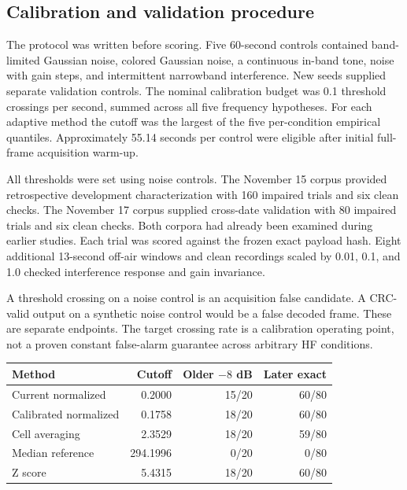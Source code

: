\documentclass[11pt,a4paper]{article}
\begin{document}
\subsection{Calibration and validation procedure}

The protocol was written before scoring. Five 60-second controls
contained band-limited Gaussian noise, colored Gaussian noise, a
continuous in-band tone, noise with gain steps, and intermittent
narrowband interference. New seeds supplied separate validation
controls. The nominal calibration budget was 0.1 threshold crossings
per second, summed across all five frequency hypotheses. For each
adaptive method the cutoff was the largest of the five per-condition
empirical quantiles. Approximately 55.14 seconds per control were
eligible after initial full-frame acquisition warm-up.

All thresholds were set using noise controls. The November 15 corpus
provided retrospective development characterization with 160 impaired
trials and six clean checks. The November 17 corpus supplied cross-date
validation with 80 impaired trials and six clean checks. Both corpora
had already been examined during earlier studies. Each trial was scored
against the frozen exact payload hash. Eight additional 13-second
off-air windows and clean recordings scaled by 0.01, 0.1, and 1.0
checked interference response and gain invariance.

A threshold crossing on a noise control is an acquisition false
candidate. A CRC-valid output on a synthetic noise control would be a
false decoded frame. These are separate endpoints. The target crossing
rate is a calibration operating point, not a proven constant false-alarm
guarantee across arbitrary HF conditions.

\begin{center}
\begin{tabular}{@{}lrrr@{}}
\toprule
Method & Cutoff & Older $-8$ dB & Later exact \\
\midrule
Current normalized & 0.2000 & 15/20 & 60/80 \\
Calibrated normalized & 0.1758 & 18/20 & 60/80 \\
Cell averaging & 2.3529 & 18/20 & 59/80 \\
Median reference & 294.1996 & 0/20 & 0/80 \\
Z score & 5.4315 & 18/20 & 60/80 \\
\bottomrule
\end{tabular}
\end{center}
\end{document}
